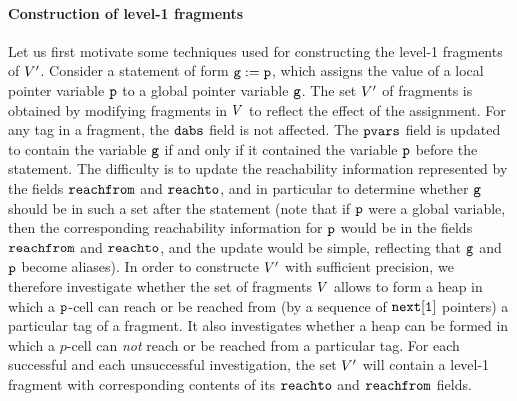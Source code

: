 \paragraph{{\bf Construction of level-1 fragments}}
Let us first motivate some techniques used for constructing the level-1 fragments
of $V'$. Consider a statement of form $\mathtt{g} := \mathtt{p}$,
which assigns the value of a local pointer variable $\mathtt{p}$ to a global
pointer variable $\mathtt{g}$. The set $V'$ of fragments is obtained by
modifying fragments in $V$ to reflect the effect of the assignment. 
For any tag in a fragment, the $\mathtt{dabs}$ field is not affected.
The $\mathtt{pvars}$ field  is updated to contain the variable $\mathtt{g}$ if and only if it contained the variable $\mathtt{p}$ before the statement. 
The difficulty is to update the reachability information represented
by the fields $\mathtt{reachfrom}$ and $\mathtt{reachto}$,
and in particular to determine whether $\mathtt{g}$ should be in such a
set after the statement
(note that if $\mathtt{p}$ were a global variable, then the corresponding
reachability information for $\mathtt{p}$ would be in the fields
$\mathtt{reachfrom}$ and $\mathtt{reachto}$, and the update would be simple,
reflecting that $\mathtt{g}$ and $\mathtt{p}$ become aliases).
In order to constructe $V'$ with sufficient precision, we
therefore investigate whether the set of fragments $V$
allows to form a heap in which a $\mathtt{p}$-cell can reach or be
reached from (by a sequence of $\tt next[1]$ pointers)
a particular tag of a fragment.
It also investigates whether a heap can be formed
in which a $p$-cell can {\em not} reach or be reached from a particular tag.
For each successful and each unsuccessful investigation,
the set $V'$ will contain a level-1 fragment with
corresponding contents of its $\mathtt{reachto}$ and $\mathtt{reachfrom}$ fields.


